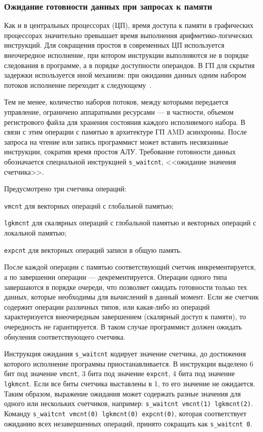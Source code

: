 \documentclass[a4paper,14pt]{extarticle}
\begin{document}
{\subsubsection{Ожидание готовности данных при запросах к памяти}
\label{section:gcn-waitcnt}

Как и в центральных процессорах (ЦП), время доступа к памяти в графических процессорах
значительно превышает время выполнения арифметико-логических инструкций.
Для сокращения простоя в современных ЦП используется внеочередное исполнение, при котором
инструкции выполняются не в порядке следования в программе, а в порядке доступности операндов.
В ГП для скрытия задержки используется иной механизм: при ожидании данных одним набором
потоков исполнение переходит к следующему~\cite{gcn-performance}.

Тем не менее, количество наборов потоков, между которыми передается управление, ограничено
аппаратными ресурсами — в частности, объемом регистрового файла для хранения состояния каждого
исполняемого набора. В связи с этим операции с памятью в архитектуре ГП AMD асинхронны.
После запроса на чтение или запись программист может вставить несвязанные инструкции,
сократив время простоя АЛУ. Требование готовности данных обозначается специальной
инструкцией \verb|s_waitcnt|, <<ожидание значения счетчика>>.

Предусмотрено три счетчика операций:
\begin{ul}
\item \verb|vmcnt| для векторных операций с глобальной памятью;
\item \verb|lgkmcnt| для скалярных операций с глобальной памятью и векторных операций с локальной памятью;
\item \verb|expcnt| для векторных операций записи в общую память.
\end{ul}

После каждой операции с памятью соответствующий счетчик инкрементируется, а по завершении
операции — декрементируется. Операции одного типа завершаются в порядке очереди, что
позволяет ожидать готовности только тех данных, которые необходимы для вычислений в данный
момент. Если же счетчик содержит операции различных типов, или какая-либо из операций
характеризуется внеочередным завершением (скалярный доступ к памяти), то очередность не гарантируется.
В таком случае программист должен ожидать обнуления соответствующего счетчика.

Инструкция ожидания \verb|s_waitcnt| кодирует значение счетчика, до достижения
которого исполнение программы приостанавливается. В инструкции выделено 6 бит под значение
\verb|vmcnt|, 3 бита под значение \verb|expcnt|, 4 бита под значение \verb|lgkmcnt|.
Если все биты счетчика выставлены в 1, то его значение не ожидается. Таким образом,
выражение ожидания может содержать разные значения для одного или нескольких счетчиков,
например: \verb|s_waitcnt vmcnt(1) lgkmcnt(2)|. Команду
\verb|s_waitcnt vmcnt(0) lgkmcnt(0) expcnt(0)|, которая соответствует ожиданию всех
незавершенных операций, принято сокращать как \verb|s_waitcnt 0|.

}
\end{document}
